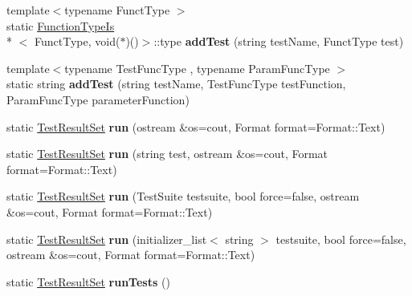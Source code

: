 \begin{DoxyCompactItemize}
\item 
\hypertarget{class_l_test_abab47e94c67dcac9c198674173a73652}{{\footnotesize template$<$typename Funct\-Type $>$ }\\static \hyperlink{struct_function_type_is}{Function\-Type\-Is}\\*
$<$ Funct\-Type, void($\ast$)()$>$\-::type {\bfseries add\-Test} (string test\-Name, Funct\-Type test)}\label{class_l_test_abab47e94c67dcac9c198674173a73652}

\item 
\hypertarget{class_l_test_a414d784ce0ba99b010ab97bc34a7d762}{{\footnotesize template$<$typename Test\-Func\-Type , typename Param\-Func\-Type $>$ }\\static string {\bfseries add\-Test} (string test\-Name, Test\-Func\-Type test\-Function, Param\-Func\-Type parameter\-Function)}\label{class_l_test_a414d784ce0ba99b010ab97bc34a7d762}

\item 
\hypertarget{class_l_test_a4f52d3983d45fdf50b894d93dda47103}{static \hyperlink{class_result_set_3_01_test_result_01_4}{Test\-Result\-Set} {\bfseries run} (ostream \&os=cout, Format format=Format\-::\-Text)}\label{class_l_test_a4f52d3983d45fdf50b894d93dda47103}

\item 
\hypertarget{class_l_test_af5ec70e5b133ed164361bcbd762304af}{static \hyperlink{class_result_set_3_01_test_result_01_4}{Test\-Result\-Set} {\bfseries run} (string test, ostream \&os=cout, Format format=Format\-::\-Text)}\label{class_l_test_af5ec70e5b133ed164361bcbd762304af}

\item 
\hypertarget{class_l_test_af56f2634bad28fcc4a399f81b876be59}{static \hyperlink{class_result_set_3_01_test_result_01_4}{Test\-Result\-Set} {\bfseries run} (Test\-Suite testsuite, bool force=false, ostream \&os=cout, Format format=Format\-::\-Text)}\label{class_l_test_af56f2634bad28fcc4a399f81b876be59}

\item 
\hypertarget{class_l_test_a6a6e0418e3ed156520a17549751c5509}{static \hyperlink{class_result_set_3_01_test_result_01_4}{Test\-Result\-Set} {\bfseries run} (initializer\-\_\-list$<$ string $>$ testsuite, bool force=false, ostream \&os=cout, Format format=Format\-::\-Text)}\label{class_l_test_a6a6e0418e3ed156520a17549751c5509}

\item 
\hypertarget{class_l_test_a7bf26591cd39583798a7487ff23354da}{static \hyperlink{class_result_set_3_01_test_result_01_4}{Test\-Result\-Set} {\bfseries run\-Tests} ()}\label{class_l_test_a7bf26591cd39583798a7487ff23354da}


\end{DoxyCompactItemize}
